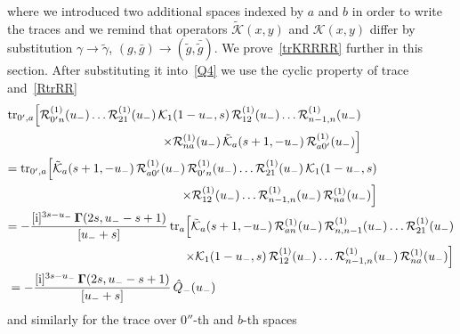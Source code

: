 \documentclass[a4paper,11pt]{article}
\renewcommand{\imath}{\mathrm{i}}
\newcommand{\tr}{\mathop{\rm tr}\nolimits}
\numberwithin{equation}{section}
\begin{document}
where we introduced two additional spaces indexed by $a$ and $b$ in order to write the traces and we remind that operators $\tilde{\mathcal{K}}(x,y)$ and $\mathcal{K}(x,y)$ differ by substitution $\gamma\to\tilde{\gamma}$, $(g,\bar{g})\to(\tilde{g},\bar{\tilde{g}})$.
We prove~\eqref{trKRRRR} further in this section. After substituting it into~\eqref{Q4} we use the cyclic property of trace and~\eqref{RtrRR}
\begin{align}
	& \nonumber
	\begin{aligned}
		\tr_{0',a}\Bigl[\mathcal{R}^{(1)}_{0'n}(u_-)\ldots\mathcal{R}^{(1)}_{21}(u_-)\,\mathcal{K}_1(1-u_-,s)\,\mathcal{R}^{(1)}_{12}(u_-)\ldots\mathcal{R}^{(1)}_{n-1,n}(u_-) \\
		\times
		\mathcal{R}^{(1)}_{na}(u_-)\,\tilde{\mathcal{K}}_a(s+1,-u_-)\,\mathcal{R}^{(1)}_{a0'}(u_-)\Bigr]
	\end{aligned}
	\\
	& \nonumber
	\begin{aligned}
		=
		\tr_{0',a}\Bigl[
		\tilde{\mathcal{K}}_a(s+1,-u_-)\,\mathcal{R}^{(1)}_{a0'}(u_-)\,
		\mathcal{R}^{(1)}_{0'n}(u_-)\ldots\mathcal{R}^{(1)}_{21}(u_-)\,\mathcal{K}_1(1-u_-,s) \\
		\times
		\mathcal{R}^{(1)}_{12}(u_-)\ldots\mathcal{R}^{(1)}_{n-1,n}(u_-) \, \mathcal{R}^{(1)}_{na}(u_-)\Bigr]
	\end{aligned}
	\\
	& \nonumber
	\begin{aligned}
		= -\frac{[\imath]^{3s-u_-}\,\mathbf{\Gamma}(2s, u_--s+1)}{[u_-+s]}
		\tr_{a}\Bigl[
		\tilde{\mathcal{K}}_a(s+1,-u_-)\,\mathcal{R}^{(1)}_{an}(u_-)\,
		\mathcal{R}^{(1)}_{n,n-1}(u_-)\ldots\mathcal{R}^{(1)}_{21}(u_-) \\
		\times
		\mathcal{K}_1(1-u_-,s) \,
		\mathcal{R}^{(1)}_{12}(u_-)\ldots\mathcal{R}^{(1)}_{n-1,n}(u_-) \, \mathcal{R}^{(1)}_{na}(u_-)\Bigr]
	\end{aligned}
	\\
	& \label{tr0'a}
	= -\frac{[\imath]^{3s-u_-}\,\mathbf{\Gamma}(2s, u_--s+1)}{[u_-+s]} \, \hat{Q}_-(u_-)
\end{align}
and similarly for the trace over $0''$-th and $b$-th spaces
\end{document}
